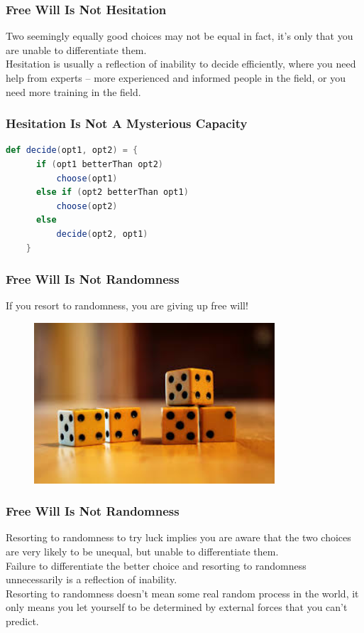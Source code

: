\documentclass[xcolor=dvipsnames]{beamer}
\theoremstyle{definition}
\begin{document}
\begin{frame}[fragile]
  \frametitle{Free Will Is Not Hesitation}
  Two seemingly equally good choices may not be equal in fact, it's only that you are unable to differentiate them.\\[0.5cm]

  Hesitation is usually a reflection of \alert{inability} to decide efficiently, where you need help from experts -- more experienced and informed people in the field, or you need more training in the field.
\end{frame}

\begin{frame}[fragile]
  \frametitle{Hesitation Is Not A Mysterious Capacity}

  \begin{lstlisting}[language=Scala]
    def decide(opt1, opt2) = {
      if (opt1 betterThan opt2)
          choose(opt1)
      else if (opt2 betterThan opt1)
          choose(opt2)
      else
          decide(opt2, opt1)
    }
  \end{lstlisting}
\end{frame}

\begin{frame}[fragile]
  \frametitle{Free Will Is Not Randomness}
  If you resort to randomness, you are giving up free will!

  \begin{figure}
    \centering
    \includegraphics[width=0.8\textwidth]{images/dice.jpg}\\
  \end{figure}
\end{frame}

\begin{frame}[fragile]
  \frametitle{Free Will Is Not Randomness}
  Resorting to randomness to try luck implies you are aware that the two choices are very likely to be unequal, but unable to differentiate them.\\[0.3cm]

  Failure to differentiate the better choice and resorting to randomness \alert{unnecessarily} is a reflection of \alert{inability}.\\[0.3cm]

  Resorting to randomness doesn't mean some real random process in the world, it only means you let yourself to be determined by external forces that you can't predict.
\end{frame}
\end{document}
